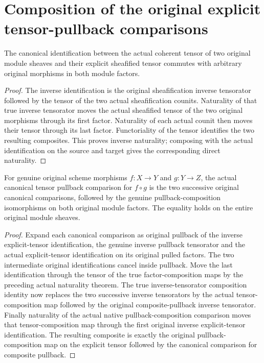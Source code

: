 \section{Composition of the original explicit tensor-pullback comparisons}

\begin{lemma}
\label{lem:cartier-actual-monoidal-explicit-tensor-naturality}
\leanok
The canonical identification between the actual coherent tensor of two
original module sheaves and their explicit sheafified tensor commutes
with arbitrary original morphisms in both module factors.
\end{lemma}
\begin{proof}
The inverse identification is the original sheafification inverse
tensorator followed by the tensor of the two actual sheafification
counits. Naturality of that true inverse tensorator moves the actual
sheafified tensor of the two original morphisms through its first
factor. Naturality of each actual counit then moves their tensor
through its last factor. Functoriality of the tensor identifies the
two resulting composites. This proves inverse naturality; composing
with the actual identification on the source and target gives the
corresponding direct naturality.
\end{proof}

\begin{lemma}
\label{lem:cartier-canonical-explicit-tensor-pullback-composition}
\leanok
For genuine original scheme morphisms $f:X\to Y$ and $g:Y\to Z$, the
actual canonical tensor pullback comparison for $f\circ g$ is the two
successive original canonical comparisons, followed by the genuine
pullback-composition isomorphisms on both original module factors.
The equality holds on the entire original module sheaves.
\end{lemma}
\begin{proof}
Expand each canonical comparison as original pullback of the inverse
explicit-tensor identification, the genuine inverse pullback tensorator
and the actual explicit-tensor identification on its original pulled
factors. The two intermediate original identifications cancel inside
pullback. Move the last identification through the tensor of the true
factor-composition maps by the preceding actual naturality theorem.
The true inverse-tensorator composition identity now replaces the two
successive inverse tensorators by the actual tensor-composition map
followed by the original composite-pullback inverse tensorator.
Finally naturality of the actual native pullback-composition comparison
moves that tensor-composition map through the first original inverse
explicit-tensor identification. The resulting composite is exactly
the original pullback-composition map on the explicit tensor followed
by the canonical comparison for composite pullback.
\end{proof}
